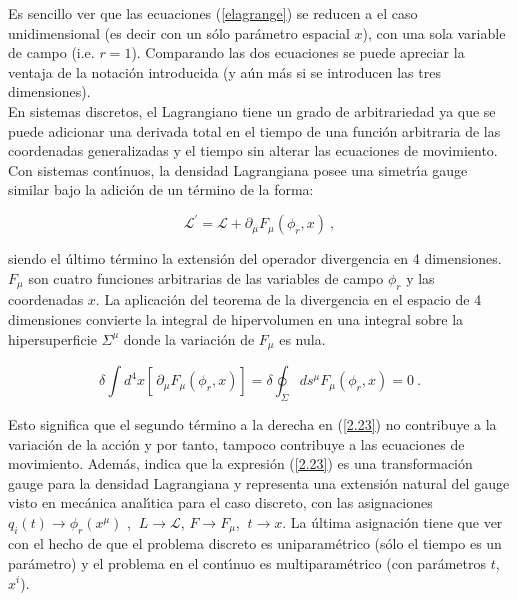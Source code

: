 \noindent
Es sencillo ver que las ecuaciones (\ref{elagrange}) se reducen a el caso unidimensional (es decir con un s\'{o}lo par\'{a}metro espacial $x$), con una sola variable de campo (i.e. $r=1$). Comparando las dos ecuaciones se puede apreciar la ventaja de la notaci\'{o}n introducida (y a\'{u}n m\'{a}s si se introducen las tres dimensiones).\\

\noindent
En sistemas discretos, el Lagrangiano tiene un grado de arbitrariedad ya que se puede adicionar una derivada total en el tiempo de una funci\'{o}n arbitraria de las coordenadas generalizadas y el tiempo sin alterar las ecuaciones de movimiento. Con sistemas cont\'{\i}nuos, la densidad Lagrangiana posee una simetr\'{\i}a gauge similar bajo la adici\'{o}n de un t\'{e}rmino de la forma:

\begin{equation}
\mathcal{L}^{\prime }=\mathcal{L}+\partial _{\mu }F_{\mu}(\phi_{r},x)~,  \label{2.23}
\end{equation}



\noindent
siendo el último t\'{e}rmino la extensi\'{o}n del operador divergencia en 4 dimensiones. $F_{\mu}$ son cuatro funciones arbitrarias de las variables de campo $\phi_{r}$ y las coordenadas $x$. La aplicaci\'{o}n del teorema de la divergencia en el espacio de 4 dimensiones convierte la integral de hipervolumen en una integral sobre la hipersuperficie $\Sigma^{\mu }$ donde la variaci\'{o}n de $F_{\mu }$ es nula.

\begin{equation}
\delta \int d^{4}x\left[ \frac{{}}{{}}\partial _{\mu }F_{\mu }\left( \phi
_{r},x\right) \right] =\delta \oint_{\Sigma }ds^{\mu }F_{\mu }\left( \phi
_{r},x\right) =0~.
\end{equation}

\noindent
Esto significa que el segundo t\'{e}rmino a la derecha en (\ref{2.23}) no contribuye a la variaci\'{o}n de la acci\'{o}n y por tanto, tampoco contribuye a las ecuaciones de movimiento. Además, indica que la expresi\'{o}n (\ref{2.23}) es una transformaci\'{o}n gauge para la densidad Lagrangiana y representa una extensi\'{o}n natural del gauge visto en mec\'{a}nica anal\'{\i}tica para el caso discreto, con las asignaciones $q_{i}(t)\rightarrow \phi _{r}\left( x^{\mu }\right) $ , $\ L\rightarrow \mathcal{L}$, $F\rightarrow F_{\mu }$, $\ t\rightarrow x$. La \'{u}ltima asignaci\'{o}n tiene que ver con el hecho de que el problema discreto es uniparam\'{e}trico (s\'{o}lo el tiempo es un par\'{a}metro) y el problema en el cont\'{\i}nuo es multiparam\'{e}trico (con par\'{a}metros $t$, $x^{i}$).

